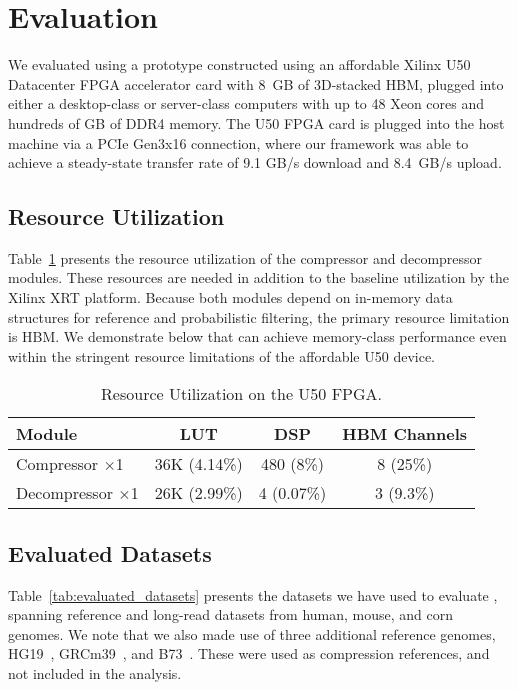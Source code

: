 \section{Evaluation}
\label{sec:evaluation}

We evaluated \name{} using a prototype constructed using an affordable Xilinx U50 Datacenter FPGA accelerator card with 8~GB of 3D-stacked HBM, plugged into either a desktop-class or server-class computers with up to 48 Xeon cores and hundreds of GB of DDR4 memory.
The U50 FPGA card is plugged into the host machine via a PCIe Gen3x16 connection, where our framework was able to achieve a steady-state transfer rate of 9.1 GB/s download and 8.4~GB/s upload.


\subsection{Resource Utilization}

Table~\ref{tab:resource_utilization} presents the resource utilization of the \name{} compressor and decompressor modules.
These resources are needed in addition to the baseline utilization by the Xilinx XRT platform.
Because both modules depend on in-memory data structures for reference and probabilistic filtering, the primary resource limitation is HBM.
We demonstrate below that \name{} can achieve memory-class performance even within the stringent resource limitations of the affordable U50 device.

\begin{table}[htb]
    \centering
    \caption{Resource Utilization on the U50 FPGA.}
    \label{tab:resource_utilization}
    \begin{tabular}{|l||c|c|c|}
        \hline
        Module & LUT & DSP & HBM Channels \\
        \hline
         Compressor $\times$1 &  36K (4.14\%) & 480 (8\%) & 8 (25\%) \\
         Decompressor $\times$1 & 26K (2.99\%) & 4 (0.07\%) & 3 (9.3\%) \\
        \hline
    \end{tabular}
\end{table}


\subsection{Evaluated Datasets}

Table~\ref{tab:evaluated_datasets} presents the datasets we have used to evaluate \name{}, spanning reference and long-read datasets from human, mouse, and corn genomes.
We note that we also made use of three additional reference genomes, HG19~\cite{raney2024ucsc}, GRCm39~\cite{GRCm39}, and B73~\cite{B73}.
These were used as compression references, and not included in the analysis. 

